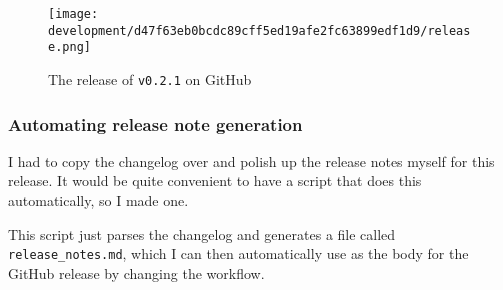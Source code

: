 \documentclass[../development.tex]{subfiles}
\begin{document}
\begin{figure}[H]
	\centering
	\texttt{[image: development/d47f63eb0bcdc89cff5ed19afe2fc63899edf1d9/release.png]}
	\caption{The release of \texttt{v0.2.1} on GitHub}
	\label{fig:development:d47f63eb0bcdc89cff5ed19afe2fc63899edf1d9:release.png}
\end{figure}

\subsubsection{Automating release note generation\label{development:preparing-for-v0.2.1:automating-release-note-generation}}

I had to copy the changelog over and polish up the release notes myself for this release. It would be quite convenient to have a script that does this automatically, so I made one.


This script just parses the changelog and generates a file called \texttt{release\_notes.md}, which I can then automatically use as the body for the GitHub release by changing the workflow.

\end{document}
